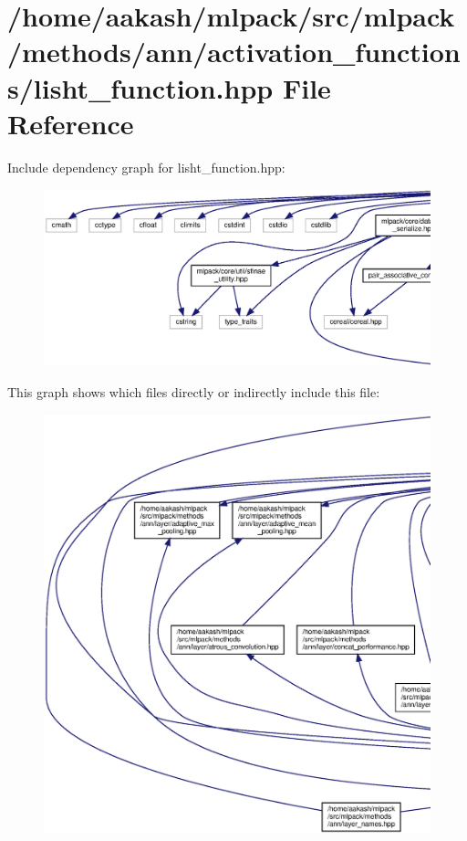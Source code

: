 \section{/home/aakash/mlpack/src/mlpack/methods/ann/activation\+\_\+functions/lisht\+\_\+function.hpp File Reference}
\label{lisht__function_8hpp}
Include dependency graph for lisht\+\_\+function.\+hpp\+:
\nopagebreak
\begin{figure}[H]
\begin{center}
\leavevmode
\includegraphics[width=350pt]{lisht__function_8hpp__incl}
\end{center}
\end{figure}
This graph shows which files directly or indirectly include this file\+:
\nopagebreak
\begin{figure}[H]
\begin{center}
\leavevmode
\includegraphics[width=350pt]{lisht__function_8hpp__dep__incl}
\end{center}
\end{figure}
